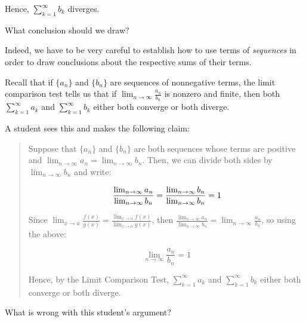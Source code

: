 \documentclass{ximera}
\begin{document}
\begin{exercise}
\begin{exercise}
Hence, $\sum_{k=1}^{\infty} b_k$ diverges.  

What conclusion should we draw?

\begin{multipleChoice}
\end{multipleChoice}

Indeed, we have to be very careful to establish how to use terms of \emph{sequences} in order to draw conclusions about the respective sums of their terms.
\begin{exercise}
Recall that if $\{a_n\}$ and $\{b_n\}$ are sequences of nonnegative terms, the limit comparison test tells us that if $\lim_{n \to \infty} \frac{a_n}{b_n} $ is nonzero and finite, then both $\sum_{k=1}^{\infty} a_k$ and $\sum_{k=1}^{\infty} b_k$ either both converge or both diverge.  

A student sees this and makes the following claim:

\begin{quote}
Suppose that $\{a_n\}$ and $\{b_n\}$ are both sequences whose terms are positive and $\lim_{n \to \infty} a_n = \lim_{n \to \infty} b_n$.  Then, we can divide both sides by $\lim_{n \to \infty} b_n$ and write:

\[
\frac{\lim_{n \to \infty} a_n}{\lim_{n \to \infty} b_n} = \frac{\lim_{n \to \infty} b_n}{\lim_{n \to \infty} b_n} =1 \\
\]

Since $\lim_{x \to a} \frac{f(x)}{g(x)} = \frac{\lim_{x \to a} f(x)}{\lim_{x \to a} g(x)}$,  then $\frac{\lim_{n \to \infty} a_n}{\lim_{n \to \infty} b_n} = \lim_{n \to \infty} \frac{a_n}{b_n}$, so using the above:

\[
 \lim_{n \to \infty} \frac{a_n}{b_n} = 1
\]

Hence, by the Limit Comparison Test, $\sum_{k=1}^{\infty} a_k$ and $\sum_{k=1}^{\infty} b_k$ either both converge or both diverge.

\end{quote}
What is wrong with this student's argument?  


\end{exercise}
\end{exercise}
\end{exercise}
\end{document}
